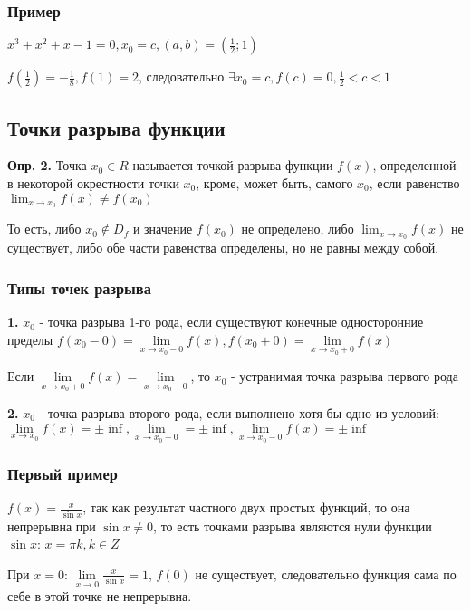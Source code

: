 \documentclass{article}
\begin{document}
\subsubsection{Пример}

$x^3 + x^2 + x - 1 = 0, x_0 = c, (a, b) = (\frac{1}{2}; 1)$

$f(\frac{1}{2}) = -\frac{1}{8}, f(1) = 2$, следовательно $\exists x_0 = c, f(c) = 0, \frac{1}{2} < c < 1$

\subsection{Точки разрыва функции}

\textbf{Опр. 2.} Точка $x_0 \in R$ называется точкой разрыва функции $f(x)$, определенной в некоторой окрестности точки $x_0$, кроме, может быть, самого $x_0$, если равенство $\lim_{x \to x_0} f(x) \ne f(x_0)$

То есть, либо $x_0 \notin D_f$ и значение $f(x_0)$ не определено, либо $\lim_{x \to x_0} f(x)$ не существует, либо обе части равенства определены, но не равны между собой.

\subsubsection{Типы точек разрыва}

\textbf{1.} $x_0$ - точка разрыва 1-го рода, если существуют конечные односторонние пределы $f(x_0 - 0) = \lim\limits_{x \to x_0 - 0} f(x), f(x_0 + 0) = \lim\limits_{x \to x_0 + 0} f(x)$

Если $\lim\limits_{x \to x_0 + 0} f(x) = \lim\limits_{x \to x_0 - 0}$, то $x_0$ - устранимая точка разрыва первого рода

\textbf{2.} $x_0$ - точка разрыва второго рода, если выполнено хотя бы одно из условий: $\lim\limits_{x \to x_0} f(x) = \pm \inf, \lim\limits_{x \to x_0 + 0} = \pm \inf, \lim\limits_{x \to x_0-0} f(x) = \pm \inf$

\subsubsection{Первый пример}

$f(x) = \frac{x}{\sin x}$, так как результат частного двух простых функций, то она непрерывна при $\sin x \ne 0$, то есть точками разрыва являются нули функции $\sin x$: $x = \pi k, k \in Z$

При $x = 0$: $\lim\limits_{x \to 0} \frac{x}{\sin x} = 1$, $f(0)$ не существует, следовательно функция сама по себе в этой точке не непрерывна.
\end{document}
